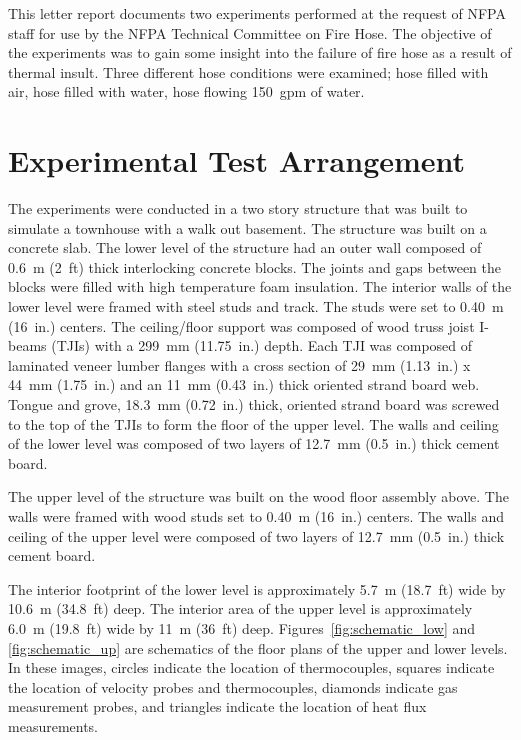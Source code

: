 \documentclass[letterpaper,11pt]{texMemo} %
\begin{document}
\maketitle %


This letter report documents two experiments performed at the request of NFPA staff for use by the NFPA Technical Committee on Fire Hose.   The objective of the experiments was to gain some insight into the failure of fire hose as a result of thermal insult.  Three different hose conditions were examined; hose filled with air, hose filled with water, hose flowing 150~gpm of water. 

\section{Experimental Test Arrangement}
The experiments were conducted in a two story structure that was built to simulate a townhouse with a walk out basement. The structure was built on a concrete slab. The lower level of the structure had an outer wall composed of 0.6~m (2~ft) thick interlocking concrete blocks. The joints and gaps between the blocks were filled with high temperature foam insulation. The interior walls of the lower level were framed with steel studs and track. The studs were set to 0.40~m (16~in.) centers. The ceiling/floor support was composed of wood truss joist I-beams (TJIs) with a 299~mm (11.75~in.) depth. Each TJI was composed of laminated veneer lumber flanges with a cross section of 29~mm (1.13~in.) x 44~mm (1.75~in.) and an 11~mm (0.43~in.) thick oriented strand board web. Tongue and grove, 18.3~mm (0.72~in.) thick, oriented strand board was screwed to the top of the TJIs to form the floor of the upper level. The walls and ceiling of the lower level was composed of two layers of 12.7~mm (0.5~in.) thick cement board. 

The upper level of the structure was built on the wood floor assembly above. The walls were framed with wood studs set to 0.40~m (16~in.) centers. The walls and ceiling of the upper level were composed of two layers of 12.7~mm (0.5~in.) thick cement board.   

The interior footprint of the lower level is approximately 5.7~m (18.7~ft) wide by 10.6~m (34.8~ft) deep. The interior area of the upper level is approximately 6.0~m (19.8~ft) wide by 11~m (36~ft) deep.	 Figures~\ref{fig:schematic_low} and \ref{fig:schematic_up} are schematics of the floor plans of the upper and lower levels. In these images, circles indicate the location of thermocouples, squares indicate the location of velocity probes and thermocouples, diamonds indicate gas measurement probes, and triangles indicate the location of heat flux measurements.
\end{document}
